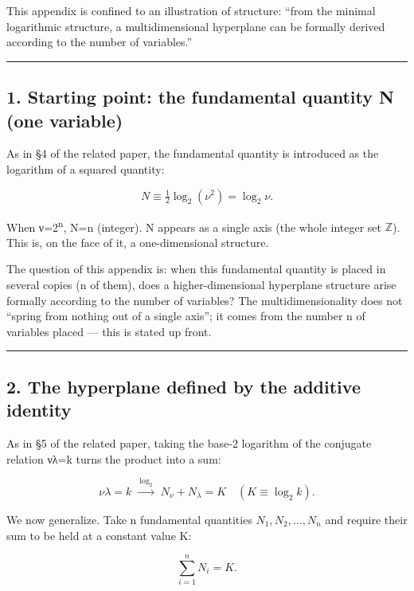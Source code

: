 \documentclass[11pt]{ltjsarticle}
\begin{document}
This appendix is confined to an illustration of structure: ``from the
minimal logarithmic structure, a multidimensional hyperplane can be
formally derived according to the number of variables.''

\begin{center}\rule{0.5\linewidth}{0.5pt}\end{center}

\subsection{1. Starting point: the fundamental quantity N (one
variable)}\label{starting-point-the-fundamental-quantity-n-one-variable}

As in §4 of the related paper, the fundamental quantity is introduced as
the logarithm of a squared quantity:

\[N \equiv \tfrac{1}{2}\log_2(\nu^2) = \log_2\nu .\]

When ν=2\textsuperscript{n}, N=n (integer). N appears as a single axis (the whole integer
set $\mathbb{Z}$). This is, on the face of it, a one-dimensional structure.

The question of this appendix is: when this fundamental quantity is
placed in several copies (n of them), does a higher-dimensional
hyperplane structure arise formally according to the number of
variables? The multidimensionality does not ``spring from nothing out of
a single axis''; it comes from the number n of variables placed --- this
is stated up front.

\begin{center}\rule{0.5\linewidth}{0.5pt}\end{center}

\subsection{2. The hyperplane defined by the additive
identity}\label{the-hyperplane-defined-by-the-additive-identity}

As in §5 of the related paper, taking the base-2 logarithm of the
conjugate relation νλ=k turns the product into a sum:

\[\nu\lambda=k \;\xrightarrow{\ \log_2\ }\; N_\nu + N_\lambda = K \quad(K\equiv\log_2 k).\]

We now generalize. Take n fundamental quantities
\(N_1, N_2, \dots, N_n\) and require their sum to be held at a constant
value K:

\[\sum_{i=1}^{n} N_i = K .\]
\end{document}
